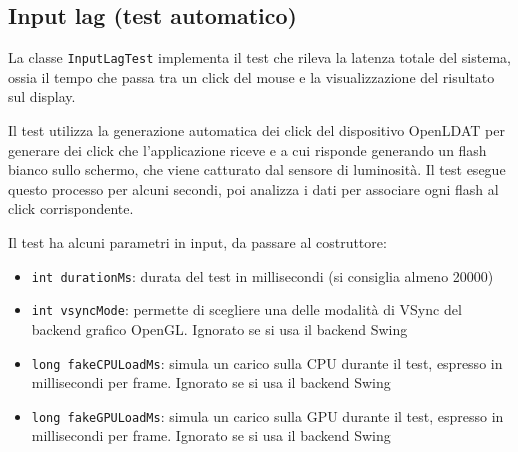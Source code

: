 \subsection{Input lag (test automatico)}
La classe \texttt{InputLagTest} implementa il test che rileva la latenza totale del sistema, ossia il tempo che passa tra un click del mouse e la visualizzazione del risultato sul display.

Il test utilizza la generazione automatica dei click del dispositivo OpenLDAT per generare dei click che l'applicazione riceve e a cui risponde generando un flash bianco sullo schermo, che viene catturato dal sensore di luminosità. Il test esegue questo processo per alcuni secondi, poi analizza i dati per associare ogni flash al click corrispondente.

Il test ha alcuni parametri in input, da passare al costruttore:\begin{itemize}
	\item \texttt{int durationMs}: durata del test in millisecondi (si consiglia almeno 20000)
	\item \texttt{int vsyncMode}: permette di scegliere una delle modalità di VSync del backend grafico OpenGL. Ignorato se si usa il backend Swing
	\item \texttt{long fakeCPULoadMs}: simula un carico sulla CPU durante il test, espresso in millisecondi per frame. Ignorato se si usa il backend Swing
	\item \texttt{long fakeGPULoadMs}: simula un carico sulla GPU durante il test, espresso in millisecondi per frame. Ignorato se si usa il backend Swing
\end{itemize}

